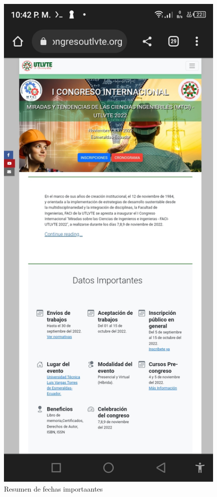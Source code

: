 \documentclass[a4paper,14px]{article}
\begin{document}
\begin{minipage}[H]{0.45\linewidth}
\begin{figure}[H]
  \centering
  \includegraphics[scale=0.3]{index1.jpg}
  \caption{Resumen de fechas importaantes }
  \label{fig:arquitectura1}
\end{figure}
  
\end{minipage}
\end{document}
